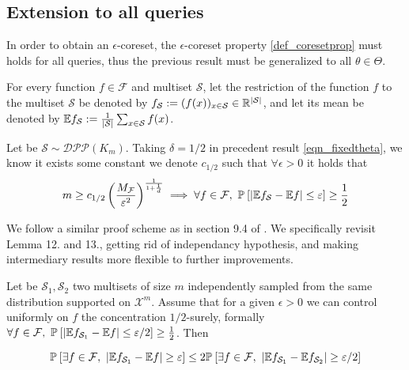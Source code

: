 \subsection{Extension to all queries}
In order to obtain an $\epsilon$-coreset, the $\epsilon$-coreset property \ref{def_coresetprop} must holds for all queries, thus the previous result must be generalized to all $\theta \in \Theta$.

For every function $f \in \mathcal{F}$ and multiset $\mathcal{S}$, let the restriction of the function $f$ to the multiset $\mathcal{S}$ be denoted by $f_{\mathcal{S}} := (f(x))_{x \in \mathcal{S}} \in \mathbb{R}^{|\mathcal{S} |}$, and let its mean be denoted by $\mathbb{E} f_\mathcal{S} := \frac{1}{|\mathcal{S}|} \sum_{x \in \mathcal{S}} f(x)$.

\begin{corollary}
	Let be $\mathcal{S} \sim  \mathcal{DPP}(K_m)$. Taking $\delta = 1/2$ in precedent result \ref{eqn_fixedtheta}, we know it exists some constant we denote $c_{1/2}$ such that $\forall \epsilon>0$ it holds that
	\begin{equation}
		m \geq c_{1/2} \left(\frac{M_{\mathcal{F}}}{\varepsilon^2} \right)^{\frac{1}{1+\frac 1 d}} \implies \forall f\in \mathcal{F},\ \mathbb{P}_{}\left[ \lvert \mathbb{E} {f_{\mathcal{S}}} - \mathbb{E} f \rvert \leq \varepsilon\right] \geq \frac 1 2
	\end{equation} 
\end{corollary}

We follow a similar proof scheme as in section 9.4 of \cite{haussler1992decisiontheoricgeneralizationofPACmodel}. We specifically revisit Lemma 12. and 13., getting rid of independancy hypothesis, and making intermediary results more flexible to further improvements.

\begin{lemma}
	Let be $\mathcal{S}_1, \mathcal{S}_2$ two multisets of size $m$ independently sampled from the same distribution supported on $\mathcal{X}^m$. Assume that for a given $\epsilon>0$ we can control uniformly on $f$ the concentration $1/2$-surely, formally $\forall f \in \mathcal{F},\ \mathbb{P}_{}\left[ \lvert \mathbb{E} {f_{\mathcal{S}_1}} - \mathbb{E} f \rvert \leq \varepsilon/2\right] \geq \frac 1 2$. Then

   \begin{equation}
	   \PPP{}{ \exists f \in \mathcal{F},\ \lvert \EE{f_{\mathcal{S}_1}} - \EE f \rvert \geq \epsilon} \leq 2\PPP{}{\exists f \in \mathcal{F},\ \lvert \EE{f_{\mathcal{S}_1}} - \EE{f_{\mathcal{S}_2}} \rvert \geq \epsilon/2 }
   \end{equation}
\end{lemma}

